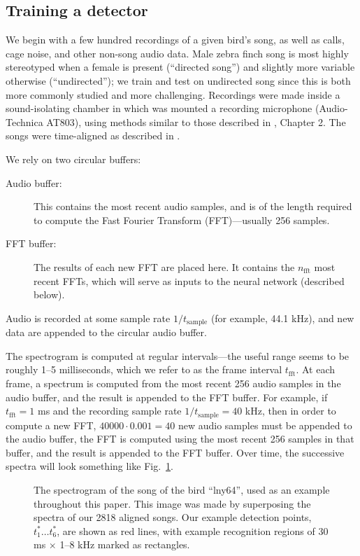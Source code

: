 \documentclass[10pt,letterpaper]{article}
\newcommand\fig[1]{Fig.~\ref{#1}}
\begin{document}
\subsection{Training a detector}

We begin with a few hundred recordings of a given bird's song, as well
as calls, cage noise, and other non-song audio data.  Male zebra finch
song is most highly stereotyped when a female is present (``directed
song'') and slightly more variable otherwise (``undirected''); we
train and test on undirected song since this is both more commonly
studied and more challenging.  Recordings were made inside a
sound-isolating chamber in which was mounted a recording microphone
(Audio-Technica AT803), using methods similar to those described in
\cite{Tchernichovski2011SAP}, Chapter 2.  The songs were time-aligned
as described in \cite{Poole2012}.

We rely on two circular buffers:
\begin{description}
\item[Audio buffer:] This contains the most recent audio samples, and
  is of the length required to compute the Fast Fourier Transform
  (FFT)---usually 256 samples.
\item[FFT buffer:] The results of each new FFT are placed here.  It
  contains the $n_\textrm{fft}$ most recent FFTs, which will serve as
  inputs to the neural network (described below).
\end{description}

Audio is recorded at some sample rate $1/t_\mathrm{sample}$ (for example, 44.1 kHz), and new data are appended to the circular audio buffer.

The spectrogram is computed at regular intervals---the useful range
seems to be roughly 1--5 milliseconds, which we refer to as the frame
interval $t_\textrm{fft}$.  At each frame, a spectrum is computed from
the most recent 256 audio samples in the audio buffer, and the result
is appended to the FFT buffer.  For example, if $t_\textrm{fft}=1$ ms
and the recording sample rate $1/t_\textrm{sample}=40$ kHz, then in
order to compute a new FFT, $40000\cdot 0.001=40$ new audio samples
must be appended to the audio buffer, the FFT is computed using the
most recent 256 samples in that buffer, and the result is appended to
the FFT buffer.  Over time, the successive spectra will look something
like \fig{fig:song}.

\begin{figure}
  \caption{The spectrogram of the song of the bird ``lny64'', used as an example
    throughout this paper.  This image was made by superposing the
    spectra of our 2818 aligned songs.  Our example detection points,
    $t^*_1\ldots t^*_6$, are shown as red lines, with example recognition
    regions of 30 ms $\times$ 1--8 kHz marked as rectangles.}
  \label{fig:song}
\end{figure}
\end{document}
